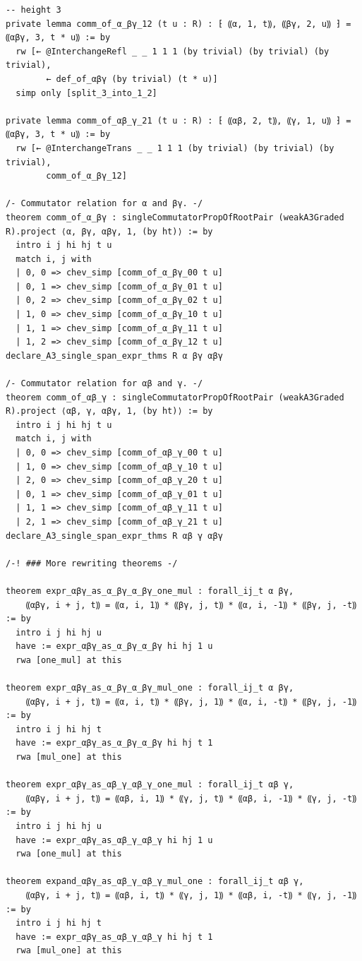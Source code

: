 \documentclass[10pt,a4paper]{article}
\begin{document}
\begin{Verbatim}
-- height 3
private lemma comm_of_α_βγ_12 (t u : R) : ⁅ ⸨α, 1, t⸩, ⸨βγ, 2, u⸩ ⁆ = ⸨αβγ, 3, t * u⸩ := by
  rw [← @InterchangeRefl _ _ 1 1 1 (by trivial) (by trivial) (by trivial),
        ← def_of_αβγ (by trivial) (t * u)]
  simp only [split_3_into_1_2]

private lemma comm_of_αβ_γ_21 (t u : R) : ⁅ ⸨αβ, 2, t⸩, ⸨γ, 1, u⸩ ⁆ = ⸨αβγ, 3, t * u⸩ := by
  rw [← @InterchangeTrans _ _ 1 1 1 (by trivial) (by trivial) (by trivial),
        comm_of_α_βγ_12]

/- Commutator relation for α and βγ. -/
theorem comm_of_α_βγ : singleCommutatorPropOfRootPair (weakA3Graded R).project ⟨α, βγ, αβγ, 1, (by ht)⟩ := by
  intro i j hi hj t u
  match i, j with
  | 0, 0 => chev_simp [comm_of_α_βγ_00 t u]
  | 0, 1 => chev_simp [comm_of_α_βγ_01 t u]
  | 0, 2 => chev_simp [comm_of_α_βγ_02 t u]
  | 1, 0 => chev_simp [comm_of_α_βγ_10 t u]
  | 1, 1 => chev_simp [comm_of_α_βγ_11 t u]
  | 1, 2 => chev_simp [comm_of_α_βγ_12 t u]
declare_A3_single_span_expr_thms R α βγ αβγ

/- Commutator relation for αβ and γ. -/
theorem comm_of_αβ_γ : singleCommutatorPropOfRootPair (weakA3Graded R).project ⟨αβ, γ, αβγ, 1, (by ht)⟩ := by
  intro i j hi hj t u
  match i, j with
  | 0, 0 => chev_simp [comm_of_αβ_γ_00 t u]
  | 1, 0 => chev_simp [comm_of_αβ_γ_10 t u]
  | 2, 0 => chev_simp [comm_of_αβ_γ_20 t u]
  | 0, 1 => chev_simp [comm_of_αβ_γ_01 t u]
  | 1, 1 => chev_simp [comm_of_αβ_γ_11 t u]
  | 2, 1 => chev_simp [comm_of_αβ_γ_21 t u]
declare_A3_single_span_expr_thms R αβ γ αβγ

/-! ### More rewriting theorems -/

theorem expr_αβγ_as_α_βγ_α_βγ_one_mul : forall_ij_t α βγ,
    ⸨αβγ, i + j, t⸩ = ⸨α, i, 1⸩ * ⸨βγ, j, t⸩ * ⸨α, i, -1⸩ * ⸨βγ, j, -t⸩ := by
  intro i j hi hj u
  have := expr_αβγ_as_α_βγ_α_βγ hi hj 1 u
  rwa [one_mul] at this

theorem expr_αβγ_as_α_βγ_α_βγ_mul_one : forall_ij_t α βγ,
    ⸨αβγ, i + j, t⸩ = ⸨α, i, t⸩ * ⸨βγ, j, 1⸩ * ⸨α, i, -t⸩ * ⸨βγ, j, -1⸩ := by
  intro i j hi hj t
  have := expr_αβγ_as_α_βγ_α_βγ hi hj t 1
  rwa [mul_one] at this

theorem expr_αβγ_as_αβ_γ_αβ_γ_one_mul : forall_ij_t αβ γ,
    ⸨αβγ, i + j, t⸩ = ⸨αβ, i, 1⸩ * ⸨γ, j, t⸩ * ⸨αβ, i, -1⸩ * ⸨γ, j, -t⸩ := by
  intro i j hi hj u
  have := expr_αβγ_as_αβ_γ_αβ_γ hi hj 1 u
  rwa [one_mul] at this

theorem expand_αβγ_as_αβ_γ_αβ_γ_mul_one : forall_ij_t αβ γ,
    ⸨αβγ, i + j, t⸩ = ⸨αβ, i, t⸩ * ⸨γ, j, 1⸩ * ⸨αβ, i, -t⸩ * ⸨γ, j, -1⸩ := by
  intro i j hi hj t
  have := expr_αβγ_as_αβ_γ_αβ_γ hi hj t 1
  rwa [mul_one] at this


\end{Verbatim}
\end{document}
